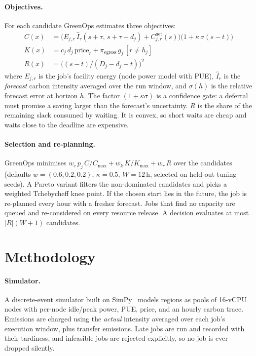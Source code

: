\paragraph{Objectives.}
For each candidate GreenOps estimates three objectives:
\begin{align*}
C(x) &= \big(E_{j,r}\,\widehat{I}_r(s{+}\tau,\,s{+}\tau{+}d_j) + C^{\text{net}}_{j,r}(s)\big)\big(1+\kappa\,\sigma(s{-}t)\big)\\
K(x) &= c_j\,d_j\,\text{price}_r + \pi_{\text{egress}}\,g_j\,[r\neq h_j]\\
R(x) &= \big((s-t)/(D_j-d_j-t)\big)^{2}
\end{align*}
where $E_{j,r}$ is the job's facility energy (node power model with
PUE), $\widehat{I}_r$ is the \emph{forecast} carbon intensity averaged
over the run window, and $\sigma(h)$ is the relative forecast error at
horizon $h$. The factor $(1+\kappa\sigma)$ is a confidence gate: a
deferral must promise a saving larger than the forecast's uncertainty.
$R$ is the share of the remaining slack consumed by waiting. It is convex,
so short waits are cheap and waits close to the deadline are expensive.

\paragraph{Selection and re-planning.}
GreenOps minimises
$w_c\,p_j\,C/C_{\max} + w_k\,K/K_{\max} + w_r\,R$ over the candidates
(defaults $w=(0.6,0.2,0.2)$, $\kappa=0.5$, $W=12$\,h, selected on
held-out tuning seeds). A Pareto variant filters the non-dominated
candidates and picks a weighted Tchebycheff knee point. If the chosen start lies in the
future, the job is re-planned every hour with a fresher forecast. Jobs
that find no capacity are queued and re-considered on every resource
release. A decision evaluates at most $|R|(W{+}1)$ candidates.

\section{Methodology}
\label{sec:method}

\paragraph{Simulator.}
A discrete-event simulator built on SimPy~\cite{simpy} models regions as
pools of 16-vCPU nodes with per-node idle/peak power, PUE, price, and an
hourly carbon trace. Emissions are charged using the \emph{actual}
intensity averaged over each job's execution window, plus transfer
emissions. Late jobs are run and recorded with their tardiness, and
infeasible jobs are rejected explicitly, so no job is ever dropped silently.


